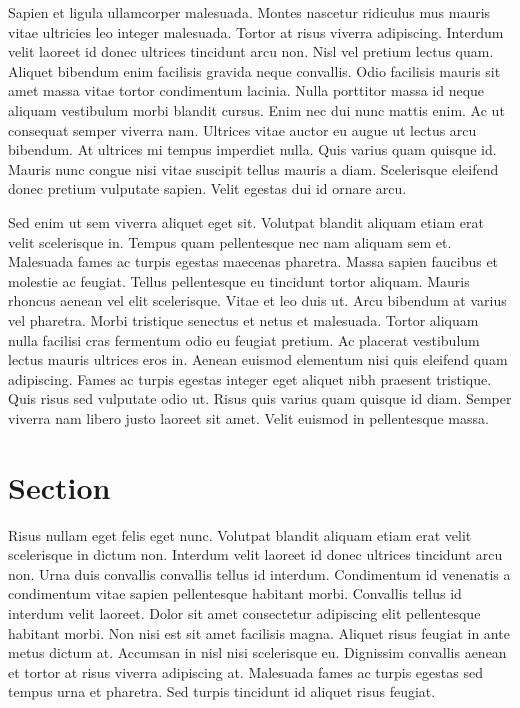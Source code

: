 \documentclass[paper = a4, fontsize = 12pt, numbers = noenddot, DIV = 15, twoside, 
paper = portrait,
listof = totoc,
listof = chapterentry,
egregdoesnotlikesansseriftitles, %
parskip = half %
]{scrbook}
\begin{document}
Sapien et ligula ullamcorper malesuada. Montes nascetur ridiculus mus mauris vitae ultricies leo integer malesuada. Tortor at risus viverra adipiscing. Interdum velit laoreet id donec ultrices tincidunt arcu non. Nisl vel pretium lectus quam. Aliquet bibendum enim facilisis gravida neque convallis. Odio facilisis mauris sit amet massa vitae tortor condimentum lacinia. Nulla porttitor massa id neque aliquam vestibulum morbi blandit cursus. Enim nec dui nunc mattis enim. Ac ut consequat semper viverra nam. Ultrices vitae auctor eu augue ut lectus arcu bibendum. At ultrices mi tempus imperdiet nulla. Quis varius quam quisque id. Mauris nunc congue nisi vitae suscipit tellus mauris a diam. Scelerisque eleifend donec pretium vulputate sapien. Velit egestas dui id ornare arcu.

Sed enim ut sem viverra aliquet eget sit. Volutpat blandit aliquam etiam erat velit scelerisque in. Tempus quam pellentesque nec nam aliquam sem et. Malesuada fames ac turpis egestas maecenas pharetra. Massa sapien faucibus et molestie ac feugiat. Tellus pellentesque eu tincidunt tortor aliquam. Mauris rhoncus aenean vel elit scelerisque. Vitae et leo duis ut. Arcu bibendum at varius vel pharetra. Morbi tristique senectus et netus et malesuada. Tortor aliquam nulla facilisi cras fermentum odio eu feugiat pretium. Ac placerat vestibulum lectus mauris ultrices eros in. Aenean euismod elementum nisi quis eleifend quam adipiscing. Fames ac turpis egestas integer eget aliquet nibh praesent tristique. Quis risus sed vulputate odio ut. Risus quis varius quam quisque id diam. Semper viverra nam libero justo laoreet sit amet. Velit euismod in pellentesque massa.

\section{Section}

Risus nullam eget felis eget nunc. Volutpat blandit aliquam etiam erat velit scelerisque in dictum non. Interdum velit laoreet id donec ultrices tincidunt arcu non. Urna duis convallis convallis tellus id interdum. Condimentum id venenatis a condimentum vitae sapien pellentesque habitant morbi. Convallis tellus id interdum velit laoreet. Dolor sit amet consectetur adipiscing elit pellentesque habitant morbi. Non nisi est sit amet facilisis magna. Aliquet risus feugiat in ante metus dictum at. Accumsan in nisl nisi scelerisque eu. Dignissim convallis aenean et tortor at risus viverra adipiscing at. Malesuada fames ac turpis egestas sed tempus urna et pharetra. Sed turpis tincidunt id aliquet risus feugiat.
\end{document}
